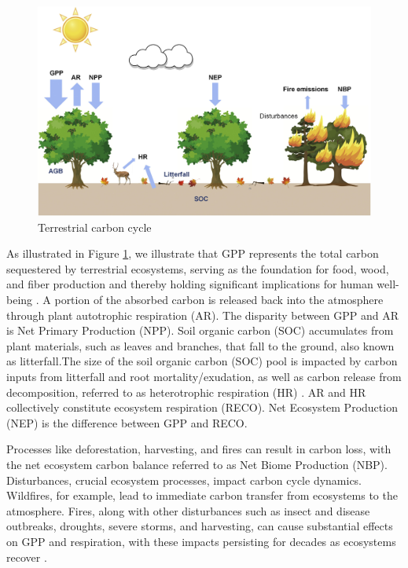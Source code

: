 \begin{figure}
    \centering
    \includegraphics[width=\textwidth]{figs/chap2/fig1.jpg}
    \caption{Terrestrial carbon cycle \citep{xiao2019remote}}
    \label{chap2:fig_fig1}
\end{figure}

As illustrated in Figure \ref{chap2:fig_fig1}, we illustrate that GPP represents the total carbon sequestered by terrestrial ecosystems, serving as the foundation for food, wood, and fiber production and thereby holding significant implications for human well-being \citep{xiao2019remote}. A portion of the absorbed carbon is released back into the atmosphere through plant autotrophic respiration (AR). The disparity between GPP and AR is Net Primary Production (NPP). Soil organic carbon (SOC) accumulates from plant materials, such as leaves and branches, that fall to the ground, also known as litterfall.The size of the soil organic carbon (SOC) pool is impacted by carbon inputs from litterfall and root mortality/exudation, as well as carbon release from decomposition, referred to as heterotrophic respiration (HR) \citep{liu2011simulating}. AR and HR collectively constitute ecosystem respiration (RECO). Net Ecosystem Production (NEP) is the difference between GPP and RECO. \par
Processes like deforestation, harvesting, and fires can result in carbon loss, with the net ecosystem carbon balance referred to as Net Biome Production (NBP). Disturbances, crucial ecosystem processes, impact carbon cycle dynamics. Wildfires, for example, lead to immediate carbon transfer from ecosystems to the atmosphere. Fires, along with other disturbances such as insect and disease outbreaks, droughts, severe storms, and harvesting, can cause substantial effects on GPP and respiration, with these impacts persisting for decades as ecosystems recover \citep{xiao2019remote}. \par

